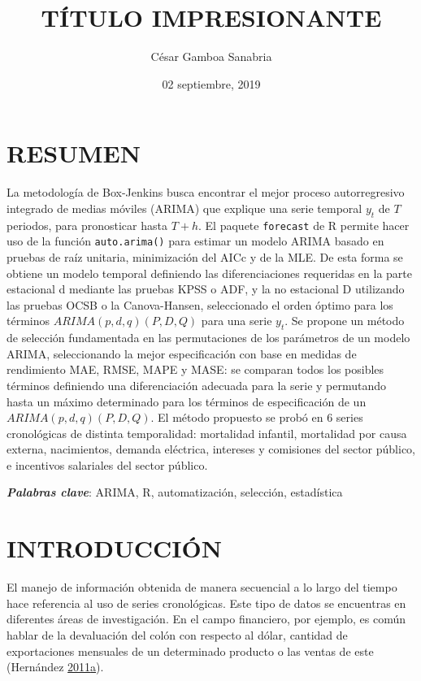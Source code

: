 \documentclass[12pt]{article}
\title{TÍTULO IMPRESIONANTE}
\author{César Gamboa Sanabria}
\date{02 septiembre, 2019}
\begin{document}
\maketitle

\newpage

\section*{RESUMEN}

La metodología de Box-Jenkins busca encontrar el mejor proceso
autorregresivo integrado de medias móviles (ARIMA) que explique una
serie temporal \(y_t\) de \(T\) periodos, para pronosticar hasta
\(T+h\). El paquete \texttt{forecast} de R permite hacer uso de la
función \texttt{auto.arima()} para estimar un modelo ARIMA basado en
pruebas de raíz unitaria, minimización del AICc y de la MLE. De esta
forma se obtiene un modelo temporal definiendo las diferenciaciones
requeridas en la parte estacional d mediante las pruebas KPSS o ADF, y
la no estacional D utilizando las pruebas OCSB o la Canova-Hansen,
seleccionado el orden óptimo para los términos \(ARIMA(p,d,q)(P,D,Q)\)
para una serie \(y_t\). Se propone un método de selección fundamentada
en las permutaciones de los parámetros de un modelo ARIMA, seleccionando
la mejor especificación con base en medidas de rendimiento MAE, RMSE,
MAPE y MASE: se comparan todos los posibles términos definiendo una
diferenciación adecuada para la serie y permutando hasta un máximo
determinado para los términos de especificación de un
\(ARIMA(p,d,q)(P,D,Q)\). El método propuesto se probó en 6 series
cronológicas de distinta temporalidad: mortalidad infantil, mortalidad
por causa externa, nacimientos, demanda eléctrica, intereses y
comisiones del sector público, e incentivos salariales del sector
público.

\textbf{\emph{Palabras clave}}: ARIMA, R, automatización, selección,
estadística

\newpage

\tableofcontents

\newpage

\section{INTRODUCCIÓN}

El manejo de información obtenida de manera secuencial a lo largo del
tiempo hace referencia al uso de series cronológicas. Este tipo de datos
se encuentras en diferentes áreas de investigación. En el campo
financiero, por ejemplo, es común hablar de la devaluación del colón con
respecto al dólar, cantidad de exportaciones mensuales de un determinado
producto o las ventas de este (Hernández
\protect\hyperlink{ref-oscarh-1}{2011}\protect\hyperlink{ref-oscarh-1}{a}).
\end{document}
